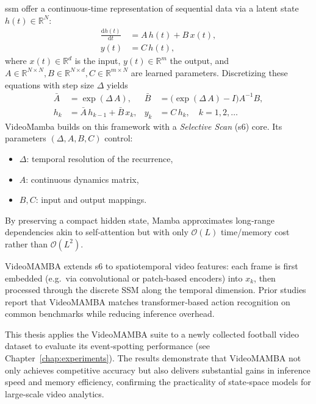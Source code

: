 \acrfull{ssm} offer a continuous‐time representation of sequential data via a latent state \(h(t)\in\mathbb{R}^N\):
\begin{align}
    \frac{\mathrm{d}h(t)}{\mathrm{d}t} &= A\,h(t) + B\,x(t),  \label{eq:ssm_continuous1}\\
    y(t) &= C\,h(t),                                    \label{eq:ssm_continuous2}
\end{align}
where \(x(t)\in\mathbb{R}^d\) is the input, \(y(t)\in\mathbb{R}^m\) the output, and \(A\in\mathbb{R}^{N\times N}, B\in\mathbb{R}^{N\times d}, C\in\mathbb{R}^{m\times N}\) are learned parameters.  Discretizing these equations with step size \(\Delta\) yields
\begin{align}
    \bar A &= \exp(\Delta\,A), 
    & 
    \bar B &= \bigl(\exp(\Delta\,A)-I\bigr)A^{-1}B,\\
    h_k &= \bar A\,h_{k-1} + \bar B\,x_k, 
    &
    y_k &= C\,h_k,
    \quad k=1,2,\dots
\end{align}
VideoMamba \cite{li_videomamba_2024} builds on this framework with a \emph{Selective Scan} (\acrshort{s6}) core.  Its parameters \((\Delta, A,B,C)\) control:
\begin{itemize}
    \item \(\Delta\): temporal resolution of the recurrence,
    \item \(A\): continuous dynamics matrix,
    \item \(B,C\): input and output mappings.
\end{itemize}

By preserving a compact hidden state, Mamba approximates long‐range dependencies akin to self‐attention but with only \(\mathcal{O}(L)\) time/memory cost rather than \(\mathcal{O}(L^2)\).  

VideoMAMBA extends \acrshort{s6} to spatiotemporal video features: each frame is first embedded (e.g.\ via convolutional or patch‐based encoders) into \(x_k\), then processed through the discrete SSM along the temporal dimension.  Prior studies \cite{lee_enhancing_mamba_s6_2024, li_videomamba_2024} report that VideoMAMBA matches transformer‐based action recognition on common benchmarks while reducing inference overhead.

This thesis applies the VideoMAMBA suite to a newly collected football video dataset to evaluate its event‐spotting performance (see Chapter~\ref{chap:experiments}). The results demonstrate that VideoMAMBA not only achieves competitive accuracy but also delivers substantial gains in inference speed and memory efficiency, confirming the practicality of state‐space models for large‐scale video analytics. 


